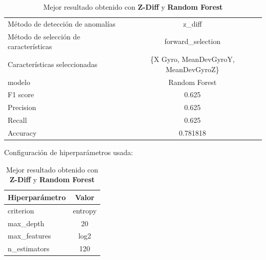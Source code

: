 \begin{appendices}
		\begin{table}[htb]
			\centering
			\caption{Mejor resultado obtenido con \textbf{Z-Diff} y \textbf{Random Forest}}
			\label{table:34}
			\begin{tabular}{lc}
				\toprule
				\midrule
				      Método de detección de anomalías &                               z\_diff \\
				Método de selección de características &                    forward\_selection \\
				         Características seleccionadas & \{X Gyro, MeanDevGyroY, MeanDevGyroZ\} \\
				                                modelo &                        Random Forest \\
				                              F1 score &                                0.625 \\
				                             Precision &                                0.625 \\
				                                Recall &                                0.625 \\
				                              Accuracy &                             0.781818 \\
				\bottomrule
			\end{tabular}
			\newline
			\newline
			Configuración de hiperparámetros usada:
			\begin{tabular}{lc}
				\toprule
				Hiperparámetro &   Valor \\
				\midrule
					 criterion & entropy \\
					 max\_depth &      20 \\
				  max\_features &    log2 \\
				  n\_estimators &     120 \\
				\bottomrule
			\end{tabular}
			

		\end{table}


\end{appendices}
